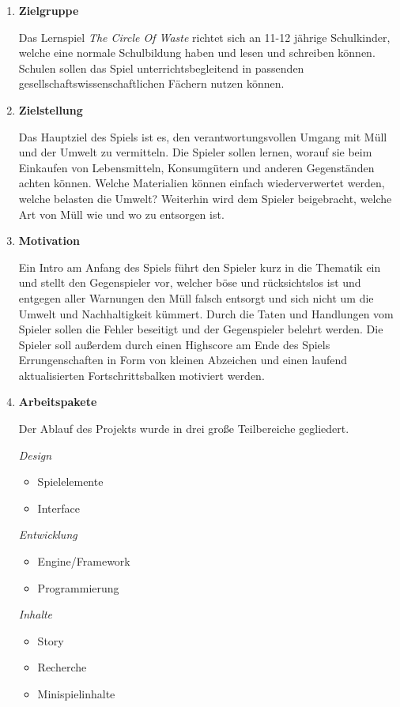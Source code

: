 \documentclass[a4paper]{article}
\newcommand{\TOP}[1]{\item \textbf{#1}\par}
\begin{document}
\begin{enumerate}

\TOP{Zielgruppe}

Das Lernspiel \textit{The Circle Of Waste} richtet sich an 11-12 jährige Schulkinder, welche eine normale Schulbildung haben und lesen und schreiben können.
Schulen sollen das Spiel unterrichtsbegleitend in passenden gesellschaftswissenschaftlichen Fächern nutzen können.


\TOP{Zielstellung}

Das Hauptziel des Spiels ist es, den verantwortungsvollen Umgang mit Müll und der Umwelt zu vermitteln.
Die Spieler sollen lernen, worauf sie beim Einkaufen von Lebensmitteln, Konsumgütern und anderen Gegenständen achten können.
Welche Materialien können einfach wiederverwertet werden, welche belasten die Umwelt?
Weiterhin wird dem Spieler beigebracht, welche Art von Müll wie und wo zu entsorgen ist.

\TOP{Motivation}

Ein Intro am Anfang des Spiels führt den Spieler kurz in die Thematik ein und stellt den Gegenspieler vor, welcher böse und rücksichtslos ist und entgegen aller Warnungen den Müll falsch entsorgt und sich nicht um die Umwelt und Nachhaltigkeit kümmert.
Durch die Taten und Handlungen vom Spieler sollen die Fehler beseitigt und der Gegenspieler belehrt werden.
Die Spieler soll außerdem durch einen Highscore am Ende des Spiels Errungenschaften in Form von kleinen Abzeichen und einen laufend aktualisierten Fortschrittsbalken motiviert werden.

\TOP{Arbeitspakete}
Der Ablauf des Projekts wurde in drei große Teilbereiche gegliedert.

\textit{Design}
\begin{itemize}
\item Spielelemente
\item Interface
\end{itemize}

\textit{Entwicklung}
\begin{itemize}
\item Engine/Framework
\item Programmierung
\end{itemize}

\textit{Inhalte}
\begin{itemize}
\item Story
\item Recherche
\item Minispielinhalte
\end{itemize}


\end{enumerate}
\end{document}
